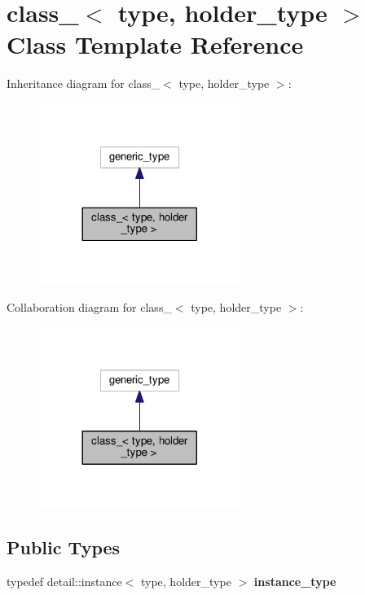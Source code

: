 \hypertarget{classclass__}{}\section{class\+\_\+$<$ type, holder\+\_\+type $>$ Class Template Reference}
\label{classclass__}


Inheritance diagram for class\+\_\+$<$ type, holder\+\_\+type $>$\+:
\nopagebreak
\begin{figure}[H]
\begin{center}
\leavevmode
\includegraphics[width=185pt]{classclass____inherit__graph}
\end{center}
\end{figure}


Collaboration diagram for class\+\_\+$<$ type, holder\+\_\+type $>$\+:
\nopagebreak
\begin{figure}[H]
\begin{center}
\leavevmode
\includegraphics[width=185pt]{classclass____coll__graph}
\end{center}
\end{figure}
\subsection*{Public Types}
\begin{DoxyCompactItemize}
\item 
typedef detail\+::instance$<$ type, holder\+\_\+type $>$ {\bfseries instance\+\_\+type}\hypertarget{classclass___aa8e40e4d7e5ef0d12823226984b85b5b}{}\label{classclass___aa8e40e4d7e5ef0d12823226984b85b5b}

\end{DoxyCompactItemize}
